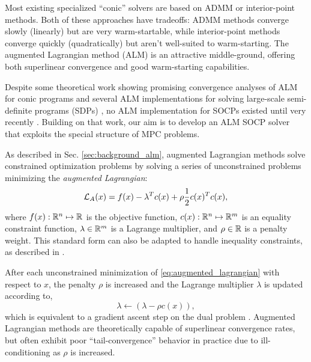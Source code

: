 \documentclass[../root.tex]{subfiles}
\begin{document}
    Most existing specialized ``conic'' solvers are based on ADMM
    \cite{garstka_COSMO_2019,odonoghue_Conic_2016} or interior-point
    \cite{domahidi_ECOS_2013} methods. Both of these approaches have tradeoffs:
    ADMM methods converge slowly (linearly) but are very warm-startable,
    while interior-point methods converge quickly (quadratically) but aren't
    well-suited to warm-starting. The augmented Lagrangian method (ALM) is an
    attractive middle-ground, offering both superlinear convergence and good
    warm-starting capabilities.
    
    Despite some theoretical work showing promising convergence analyses of
    ALM for conic programs 
    \cite{liu_Convergence_2008,shapiro_Properties_2004,sun_Rate_2008,cui_Rsuperlinear_2019,hang_Augmented_2020}
    and several ALM
    implementations for solving large-scale semi-definite programs (SDPs)
    \cite{zhao_NewtonCG_2010,li_QSDPNAL_2018}, no ALM implementation for SOCPs
    existed until very recently \cite{liang_Inexact_2020}.
    Building on that work, our aim is to develop an ALM SOCP solver that
    exploits the special structure of MPC problems.

    As described in Sec. \ref{sec:background_alm}, augmented Lagrangian
    methods solve constrained optimization problems by solving a series of
    unconstrained problems minimizing the
    \textit{augmented Lagrangian}:
    \begin{equation} \label{eq:augmented_lagrangian}
        \mathcal{L}_A(x) = f(x) - \lambda^T c(x) + \rho \frac{1}{2} c(x)^T c(x),
    \end{equation}
    where $f(x) : \mathbb{R}^{n} \mapsto \mathbb{R}^{}$ is the objective function, $c(x) : \mathbb{R}^{n}
    \mapsto \mathbb{R}^{m}$ is an equality constraint function, $\lambda \in \mathbb{R}^{m}$ is a
    Lagrange multiplier, and $\rho \in \mathbb{R}$ is a penalty weight. This standard
    form can also be adapted to handle inequality constraints, as described
    in \cite{howell_ALTRO_2019} \cite{toussaint_Novel_2014}.
    
    After each unconstrained minimization of \eqref{eq:augmented_lagrangian}
    with respect to $x$, the penalty $\rho$ is increased and the Lagrange
    multiplier $\lambda$ is updated according to,
    \begin{equation} \label{eq:al_dual_update2}
        \lambda \gets \left( \lambda - \rho c(x) \right) ,
    \end{equation}
    which is equivalent to a gradient ascent step on the dual problem \cite{bertsekas_Constrained_1996}.
    Augmented Lagrangian methods are theoretically capable of superlinear
    convergence rates, but often exhibit poor ``tail-convergence'' behavior
    in practice due to ill-conditioning as $\rho$ is increased.
    
\end{document}
